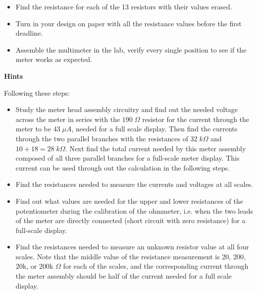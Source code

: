 \begin{itemize}
  \item Find the resistance for each of the 13 resistors with their values 
    erased.

  \item Turn in your design on paper with all the resistance values before
    the first deadline. 

  \item Assemble the multimeter in the lab, verify every single position 
    to see if the meter works as expected.
    
\end{itemize}

{\bf Hints} 

Following these steps:

\begin{itemize}
\item Study the meter head assembly circuitry and find out the needed voltage 
  across the meter in series with the $190\; \Omega$ resistor for the current 
  through the meter to be $43 \;\mu A$, needed for a full scale display. Then 
  find the currents through the two parallel branches with the resistances of 
  $32\; k\Omega$ and $10+18=28\;k\Omega$. Next find the total current needed 
  by this meter assembly composed of all three parallel branches for a 
  full-scale meter display. This current can be used through out the calculation 
  in the following steps.

\item Find the resistances needed to measure the currents and voltages at all
  scales.

\item Find out what values are needed for the upper and lower resistances of the 
  potentiometer during the calibration of the ohmmeter, i.e. when the two leads
  of the meter are directly connected (short circuit with zero resistance) for a 
  full-scale display.

\item Find the resistances needed to measure an unknown resistor value at all
  four scales. Note that the middle value of the resistance measurement is 20, 
  200, 20k, or 200k $\Omega$ for each of the scales, and the corresponding 
  current through the meter assembly should be half of the current needed for 
  a full scale display.

\end{itemize}




